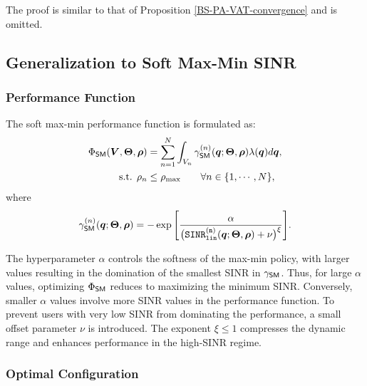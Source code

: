 \noindent The proof is similar to that of Proposition \ref{BS-PA-VAT-convergence} and is omitted.




\subsection{Generalization to Soft Max-Min SINR}\label{SM-Subsection}


\subsubsection{Performance Function}\label{SM-Objective}
The soft max-min performance function is formulated as:
\begin{align}\label{soft-max-min-objective}
    \Phi_{{\sf SM}}(\bm{V}, \mathbf{\Theta}, \bm{\rho}) &=  \sum_{n=1}^{N} \int_{V_n} \gamma^{(n)}_{{\sf SM}} (\bm{q}; \mathbf{\Theta}, \bm{\rho}) \lambda(\bm{q}) d\bm{q}, \\
    \textrm{s.t. } \rho_n &\leq \rho_{\max} \qquad \forall n \in \{1,\cdots, N\}, \label{soft-max-min-objective-constraint}
\end{align}
where 
\begin{align}\label{Soft-max-min}
\gamma^{(n)}_{\sf SM}(\bm{q}; \mathbf{\Theta}, \bm{\rho})
= - \exp  \Bigg[ \frac{\alpha}{\big(\mathtt{SINR^{(n)}_{lin}}(\bm{q}; \mathbf{\Theta}, \bm{\rho}) + \nu \big)^{\xi}}\Bigg].
\end{align}

The hyperparameter $\alpha$ controls the softness of the max-min policy, with larger values resulting in the domination of the smallest SINR in $\gamma_{{\sf SM}}$. Thus, for large $\alpha$ values, optimizing $\Phi_{{\sf SM}}$ reduces to maximizing the minimum SINR. 
Conversely, smaller $\alpha$ values involve more SINR values in the performance function. To prevent users with very low SINR from dominating the performance, a small offset parameter $\nu$ is introduced. %
The exponent $\xi \leq 1$ compresses the dynamic range and enhances performance in the high-SINR regime.



\subsubsection{Optimal Configuration}\label{SM-Optimal-Configuration}

